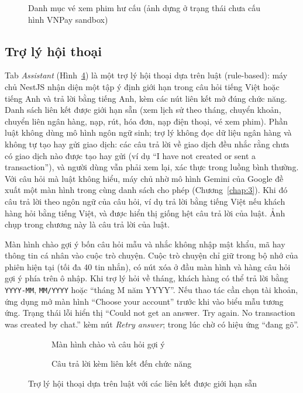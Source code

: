 \begin{figure}[H]
\centering
{}
\caption{Danh mục vé xem phim hư cấu (ảnh dựng ở trạng thái chưa cấu hình VNPay sandbox)}
\label{fig:ch4-movies}
\end{figure}

\subsection{Trợ lý hội thoại}
\label{sec:ch4-assistant}

Tab \textit{Assistant} (Hình~\ref{fig:ch4-assistant}) là một trợ lý hội thoại dựa trên luật (rule-based): máy chủ NestJS nhận diện một tập ý định giới hạn trong câu hỏi tiếng Việt hoặc tiếng Anh và trả lời bằng tiếng Anh, kèm các nút liên kết mở đúng chức năng. Danh sách liên kết được giới hạn sẵn (xem lịch sử theo tháng, chuyển khoản, chuyển liên ngân hàng, nạp, rút, hóa đơn, nạp điện thoại, vé xem phim). Phần luật không dùng mô hình ngôn ngữ sinh; trợ lý không đọc dữ liệu ngân hàng và không tự tạo hay gửi giao dịch: các câu trả lời về giao dịch đều nhắc rằng chưa có giao dịch nào được tạo hay gửi (ví dụ ``I have not created or sent a transaction''), và người dùng vẫn phải xem lại, xác thực trong luồng bình thường.
Với câu hỏi mà luật không hiểu, máy chủ nhờ mô hình Gemini của Google đề xuất một màn hình trong cùng danh sách cho phép (Chương~\ref{chap:3}). Khi đó câu trả lời theo ngôn ngữ của câu hỏi, ví dụ trả lời bằng tiếng Việt nếu khách hàng hỏi bằng tiếng Việt, và được hiển thị giống hệt câu trả lời của luật. Ảnh chụp trong chương này là câu trả lời của luật.

Màn hình chào gợi ý bốn câu hỏi mẫu và nhắc không nhập mật khẩu, mã hay thông tin cá nhân vào cuộc trò chuyện. Cuộc trò chuyện chỉ giữ trong bộ nhớ của phiên hiện tại (tối đa 40 tin nhắn), có nút xóa ở đầu màn hình và hàng câu hỏi gợi ý phía trên ô nhập. Khi trợ lý hỏi về tháng, khách hàng có thể trả lời bằng \texttt{YYYY-\allowbreak{}MM}, \texttt{MM/\allowbreak{}YYYY} hoặc ``tháng M năm YYYY''. Nếu thao tác cần chọn tài khoản, ứng dụng mở màn hình ``Choose your account'' trước khi vào biểu mẫu tương ứng. Trạng thái lỗi hiển thị ``Could not get an answer. Try again. No transaction was created by chat.'' kèm nút \textit{Retry answer}; trong lúc chờ có hiệu ứng ``đang gõ''.

\begin{figure}[H]
\centering
\begin{subfigure}[t]{0.4\textwidth}
  \centering
  \caption{Màn hình chào và câu hỏi gợi ý}
  \label{fig:ch4-assistant-welcome}
\end{subfigure}\hspace{0.05\textwidth}%
\begin{subfigure}[t]{0.4\textwidth}
  \centering
  \caption{Câu trả lời kèm liên kết đến chức năng}
  \label{fig:ch4-assistant-chat}
\end{subfigure}
\caption{Trợ lý hội thoại dựa trên luật với các liên kết được giới hạn sẵn}
\label{fig:ch4-assistant}
\end{figure}

